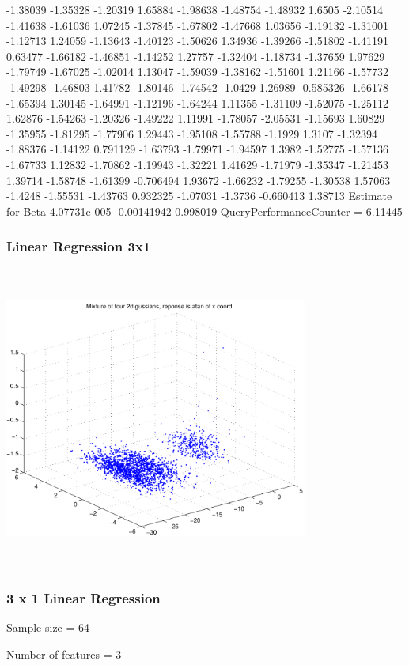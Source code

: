 \documentclass[9pt]{article}
\theoremstyle{plain}
\theoremstyle{definition}
\theoremstyle{remark}
\numberwithin{equation}{section}
\begin{document}
-1.38039
-1.35328
-1.20319
1.65884
-1.98638
-1.48754
-1.48932
1.6505
-2.10514
-1.41638
-1.61036
1.07245
-1.37845
-1.67802
-1.47668
1.03656
-1.19132
-1.31001
-1.12713
1.24059
-1.13643
-1.40123
-1.50626
1.34936
-1.39266
-1.51802
-1.41191
0.63477
-1.66182
-1.46851
-1.14252
1.27757
-1.32404
-1.18734
-1.37659
1.97629
-1.79749
-1.67025
-1.02014
1.13047
-1.59039
-1.38162
-1.51601
1.21166
-1.57732
-1.49298
-1.46803
1.41782
-1.80146
-1.74542
-1.0429
1.26989
-0.585326
-1.66178
-1.65394
1.30145
-1.64991
-1.12196
-1.64244
1.11355
-1.31109
-1.52075
-1.25112
1.62876
-1.54263
-1.20326
-1.49222
1.11991
-1.78057
-2.05531
-1.15693
1.60829
-1.35955
-1.81295
-1.77906
1.29443
-1.95108
-1.55788
-1.1929
1.3107
-1.32394
-1.88376
-1.14122
0.791129
-1.63793
-1.79971
-1.94597
1.3982
-1.52775
-1.57136
-1.67733
1.12832
-1.70862
-1.19943
-1.32221
1.41629
-1.71979
-1.35347
-1.21453
1.39714
-1.58748
-1.61399
-0.706494
1.93672
-1.66232
-1.79255
-1.30538
1.57063
-1.4248
-1.55531
-1.43763
0.932325
-1.07031
-1.3736
-0.660413
1.38713
Estimate for Beta
4.07731e-005
-0.00141942
0.998019
QueryPerformanceCounter  =  6.11445
\subsubsection{Linear Regression 3x1}
\includegraphics[width=10.0cm,height=10.0cm]{AtanDataSet.pdf}

\subsubsection{3 x 1 Linear Regression}
Sample size = 64

Number of features = 3
\end{document}
